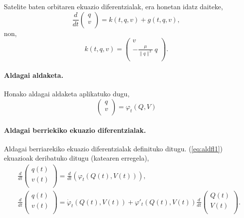 Satelite baten orbitaren ekuazio diferentzialak, era honetan idatz daiteke,
\begin{equation*}
\frac{d}{dt}\left(\begin{array}{c}
                q  \\
                v  \\
\end{array}\right)
= k(t,q,v)         
+ g(t,q,v), 
\end{equation*}
non,
\begin{equation*}
k(t,q,v)=\left(\begin{array}{c}
                 v \\
                -\frac{\mu}{\|q\|^3} \ q\\
\end{array}\right).
\end{equation*}

\paragraph*{Aldagai aldaketa.} Honako aldagai aldaketa aplikatuko dugu,
\begin{equation}
\label{eq:aldfl1}
\left(\begin{array}{c}
                q  \\
                v  \\
\end{array}\right)= \varphi_t(Q,V)
\end{equation}

\paragraph*{Aldagai berriekiko ekuazio diferentzialak.}
Aldagai berriarekiko ekuazio diferentzialak definituko ditugu. (\ref{eq:aldfl1}) ekuazioak deribatuko ditugu (katearen erregela),
\begin{align*}
&\frac{d}{dt}\left(\begin{array}{c}
                q(t)  \\
                v(t)  \\
\end{array}\right)=
 \frac{d}{dt} \left(\varphi_t(Q(t),V(t)) \right), \\
&\frac{d}{dt}\left(\begin{array}{c}
                q(t)  \\
                v(t)  \\
\end{array}\right)= 
\dot{\varphi}_t (Q(t),V(t)) + \varphi'_t(Q(t),V(t)) 
\frac{d}{dt}\left(\begin{array}{c}
                Q(t)  \\
                V(t)  \\
\end{array}\right).
\end{align*}


